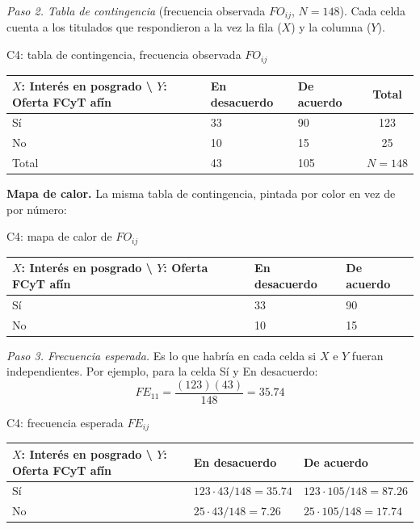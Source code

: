 \textit{Paso 2. Tabla de contingencia} (frecuencia observada $FO_{ij}$, $N = 148$). Cada celda cuenta a los titulados que respondieron a la vez la fila ($X$) y la columna ($Y$).

\begin{mitabla}{C4: tabla de contingencia, frecuencia observada $FO_{ij}$}
\begin{tabular}{L{3.8cm}C{3.00cm}C{3.00cm}|c}
\toprule
$X$: Interés en posgrado \textbackslash{} $Y$: Oferta FCyT afín & En desacuerdo & De acuerdo & Total \\
\midrule
Sí & 33 & 90 & 123 \\
No & 10 & 15 & 25 \\
\midrule
Total & 43 & 105 & $N = 148$ \\
\bottomrule
\end{tabular}
\end{mitabla}

\textbf{Mapa de calor.} La misma tabla de contingencia, pintada por color en vez de por número:

\begin{mitabla}{C4: mapa de calor de $FO_{ij}$}
\begin{tabular}{L{3.8cm}C{3.00cm}C{3.00cm}}
\toprule
$X$: Interés en posgrado \textbackslash{} $Y$: Oferta FCyT afín & En desacuerdo & De acuerdo \\
\midrule
Sí & 33 & 90 \\
No & 10 & 15 \\
\bottomrule
\end{tabular}
\end{mitabla}

\textit{Paso 3. Frecuencia esperada.} Es lo que habría en cada celda si $X$ e $Y$ fueran independientes. Por ejemplo, para la celda Sí y En desacuerdo:
\[
FE_{11} = \frac{(123)(43)}{148} = 35.74
\]

\begin{mitabla}{C4: frecuencia esperada $FE_{ij}$}
\begin{tabular}{L{3.8cm}C{3.00cm}C{3.00cm}}
\toprule
$X$: Interés en posgrado \textbackslash{} $Y$: Oferta FCyT afín & En desacuerdo & De acuerdo \\
\midrule
Sí & $123\cdot43/148 = 35.74$ & $123\cdot105/148 = 87.26$ \\
No & $25\cdot43/148 = 7.26$ & $25\cdot105/148 = 17.74$ \\
\bottomrule
\end{tabular}
\end{mitabla}

